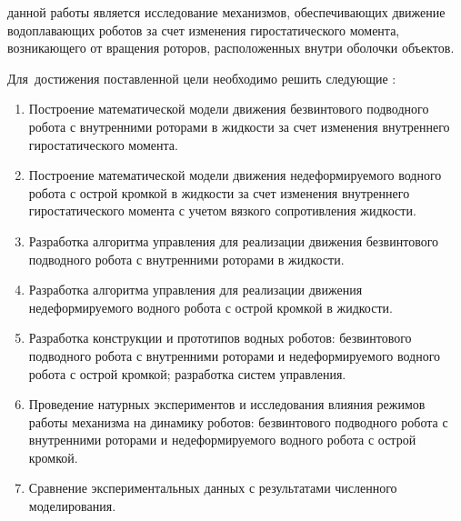 {\aim} данной работы является исследование механизмов, обеспечивающих движение водоплавающих роботов за счет изменения гиростатического момента, возникающего от вращения роторов, расположенных внутри оболочки объектов.

Для~достижения поставленной цели необходимо решить следующие {\tasks}:
\begin{enumerate}
  \item Построение математической модели движения безвинтового подводного робота с внутренними роторами в жидкости за счет изменения внутреннего гиростатического момента.
  \item Построение математической модели движения недеформируемого водного робота с острой кромкой в жидкости за счет изменения внутреннего гиростатического момента с учетом вязкого сопротивления жидкости.
  \item Разработка алгоритма управления для реализации движения безвинтового подводного робота с внутренними роторами в жидкости.
  \item Разработка алгоритма управления для реализации движения недеформируемого водного робота с острой кромкой в жидкости.
  \item Разработка конструкции и прототипов водных роботов: безвинтового подводного робота с внутренними роторами и недеформируемого водного робота с острой кромкой; разработка систем управления.
  \item Проведение натурных экспериментов и исследования влияния режимов работы механизма на динамику роботов: безвинтового подводного робота с внутренними роторами и недеформируемого водного робота с острой кромкой.
  \item Сравнение экспериментальных данных с результатами численного моделирования.
\end{enumerate}


